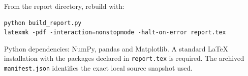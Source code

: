 \documentclass[11pt,a4paper]{article}
\begin{document}
From the report directory, rebuild with:
\begin{verbatim}
python build_report.py
latexmk -pdf -interaction=nonstopmode -halt-on-error report.tex
\end{verbatim}
Python dependencies: NumPy, pandas and Matplotlib. A standard LaTeX installation
with the packages declared in \texttt{report.tex} is required. The archived
\texttt{manifest.json} identifies the exact local source snapshot used.
\end{document}
